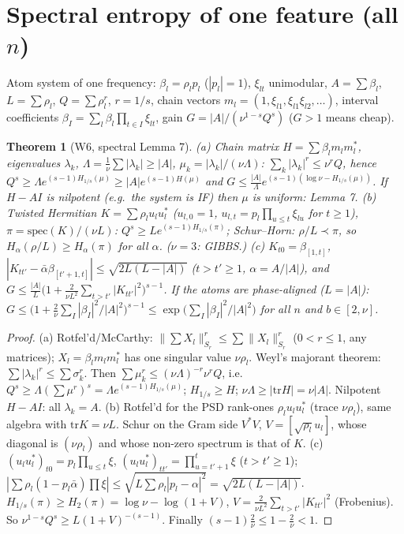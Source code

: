 \documentclass[11pt]{article}
\newtheorem{theorem}{Theorem}\newtheorem{lemma}[theorem]{Lemma}\newtheorem{corollary}[theorem]{Corollary}
\theoremstyle{remark}\newtheorem{remark}[theorem]{Remark}
\newcommand{\Hr}{H_{1/s}}
\begin{document}
\section{Spectral entropy of one feature (all $n$)}
Atom system of one frequency: $\beta_l=\rho_lp_l$ ($|p_l|=1$), $\xi_{lt}$ unimodular, $A=\sum\beta_l$, $L=\sum\rho_l$, $Q=\sum\rho_l^r$, $r=1/s$,
chain vectors $m_l=(1,\xi_{l1},\xi_{l1}\xi_{l2},\dots)$, interval coefficients $\beta_I=\sum_l\beta_l\prod_{t\in I}\xi_{lt}$, gain
$G=|A|/(\nu^{1-s}Q^s)$ ($G>1$ means cheap).
\begin{theorem}[W6, spectral Lemma 7]\label{W6}
(a) Chain matrix $H=\sum\beta_lm_lm_l^*$, eigenvalues $\lambda_k$, $\Lambda=\frac1\nu\sum|\lambda_k|\ge|A|$, $\mu_k=|\lambda_k|/(\nu\Lambda)$:
$\sum_k|\lambda_k|^r\le\nu^rQ$, hence $Q^s\ge\Lambda e^{(s-1)\Hr(\mu)}\ge|A|e^{(s-1)H(\mu)}$ and $G\le\frac{|A|}{\Lambda}e^{(s-1)(\log\nu-\Hr(\mu))}$.
If $H-AI$ is nilpotent (e.g.\ the system is IF) then $\mu$ is uniform: Lemma 7.
(b) Twisted Hermitian $K=\sum\rho_lu_lu_l^*$ ($u_{l,0}=1$, $u_{l,t}=p_l\prod_{u\le t}\xi_{lu}$ for $t\ge1$), $\pi=\mathrm{spec}(K)/(\nu L)$:
$Q^s\ge Le^{(s-1)\Hr(\pi)}$; Schur--Horn: $\rho/L\prec\pi$, so $H_\alpha(\rho/L)\ge H_\alpha(\pi)$ for all $\alpha$. ($\nu=3$: GIBBS.)
(c) $K_{t0}=\beta_{[1,t]}$, $|K_{tt'}-\bar\alpha\beta_{[t'+1,t]}|\le\sqrt{2L(L-|A|)}$ ($t>t'\ge1$, $\alpha=A/|A|$), and
$G\le\frac{|A|}{L}\big(1+\frac{2}{\nu L^2}\sum_{t>t'}|K_{tt'}|^2\big)^{s-1}$. If the atoms are phase-aligned ($L=|A|$):
$G\le\big(1+\frac2\nu\sum_I|\beta_I|^2/|A|^2\big)^{s-1}\le\exp\big(\sum_I|\beta_I|^2/|A|^2\big)$ for all $n$ and $b\in[2,\nu]$.
\end{theorem}
\begin{proof}
(a) Rotfel'd/McCarthy: $\|\sum X_l\|_{S_r}^r\le\sum\|X_l\|_{S_r}^r$ ($0<r\le1$, any matrices); $X_l=\beta_lm_lm_l^*$ has one singular value
$\nu\rho_l$. Weyl's majorant theorem: $\sum|\lambda_k|^r\le\sum\sigma_k^r$. Then $\sum\mu_k^r\le(\nu\Lambda)^{-r}\nu^rQ$, i.e.\
$Q^s\ge\Lambda(\sum\mu^r)^s=\Lambda e^{(s-1)\Hr(\mu)}$; $\Hr\ge H$; $\nu\Lambda\ge|\mathrm{tr}H|=\nu|A|$. Nilpotent $H-AI$: all $\lambda_k=A$.
(b) Rotfel'd for the PSD rank-ones $\rho_lu_lu_l^*$ (trace $\nu\rho_l$), same algebra with $\mathrm{tr}K=\nu L$. Schur on the Gram side
$V^*V$, $V=[\sqrt{\rho_l}u_l]$, whose diagonal is $(\nu\rho_l)$ and whose non-zero spectrum is that of $K$.
(c) $(u_lu_l^*)_{t0}=p_l\prod_{u\le t}\xi$, $(u_lu_l^*)_{tt'}=\prod_{u=t'+1}^t\xi$ ($t>t'\ge1$); $|\sum\rho_l(1-p_l\bar\alpha)\prod\xi|\le
\sqrt{L\sum\rho_l|p_l-\alpha|^2}=\sqrt{2L(L-|A|)}$. $\Hr(\pi)\ge H_2(\pi)=\log\nu-\log(1+V)$, $V=\frac{2}{\nu L^2}\sum_{t>t'}|K_{tt'}|^2$
(Frobenius). So $\nu^{1-s}Q^s\ge L(1+V)^{-(s-1)}$. Finally $(s-1)\frac2\nu\le1-\frac2\nu<1$.
\end{proof}
\end{document}
